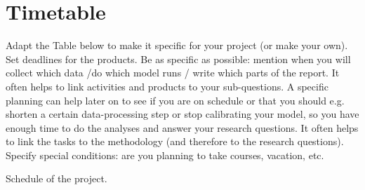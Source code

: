 \documentclass[twocolumn, 10pt, a4paper]{article}
\begin{document}
	\section{Timetable}
	
	Adapt the Table below to make it specific for your project (or make your own). Set deadlines for the products. Be as specific as possible: mention when you will collect which data /do which model runs / write which parts of the report. It often helps to link activities and products to your sub-questions. A specific planning can help later on to see if you are on schedule or that you should e.g. shorten a certain data-processing step or stop calibrating your model, so you have enough time to do the analyses and answer your research questions. It often helps to link the tasks to the methodology (and therefore to the research questions). Specify special conditions: are you planning to take courses, vacation, etc. 
	
	
	\begin{table*}[t]
		\caption{Schedule of the project.}
		\label{tab:schedule}
	\end{table*}
	
	
	
	
	
	
	
	
	
	
	
	
	
\end{document}
